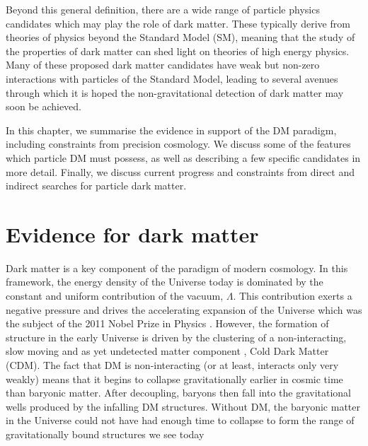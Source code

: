 Beyond this general definition, there are a wide range of particle physics candidates which may play the role of dark matter. These typically derive from theories of physics beyond the Standard Model (SM), meaning that the study of the properties of dark matter can shed light on theories of high energy physics. Many of these proposed dark matter candidates have weak but non-zero interactions with particles of the Standard Model, leading to several avenues through which it is hoped the non-gravitational detection of dark matter may soon be achieved.

In this chapter, we summarise the evidence in support of the DM paradigm, including constraints from precision cosmology. We discuss some of the features which particle DM must possess, as well as describing a few specific candidates in more detail. Finally, we discuss current progress and constraints from direct and indirect searches for particle dark matter.


\section{Evidence for dark matter}


Dark matter is a key component of the \LCDM paradigm of modern cosmology. In this framework, the energy density of the Universe today is dominated by the constant and uniform contribution of the vacuum, $\Lambda$. This contribution exerts a negative pressure and drives the accelerating expansion of the Universe which was the subject of the 2011 Nobel Prize in Physics \cite{Riess:1998, Perlmutter:1999}. However, the formation of structure in the early Universe is driven by the clustering of a non-interacting, slow moving and as yet undetected matter component \cite{Kolb:1990}, Cold Dark Matter (CDM). The fact that DM is non-interacting (or at least, interacts only very weakly) means that it begins to collapse gravitationally earlier in cosmic time than baryonic matter. After decoupling, baryons then fall into the gravitational wells produced by the infalling DM structures. Without DM, the baryonic matter in the Universe could not have had enough time to collapse to form the range of gravitationally bound structures we see today \cite{Blumental:1984,Kolb:1990}



